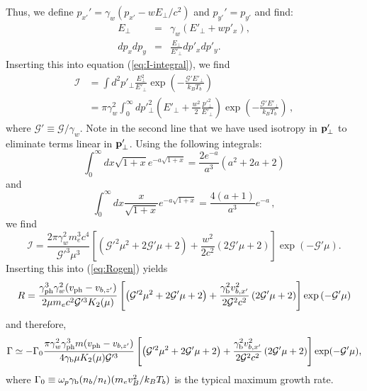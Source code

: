 \documentclass[usenatbib,iop,apj,numberedappendix]{aeb_emulateapj_2015}
\newcommand\qc[1]{{\color{red} \bf #1}}
\newcommand\bmath[1] {\mbox{\boldmath$\rm #1$}}
\def\bp{\bmath{p}}
\def\gph{\gamma_{\rm ph}}
\def\vph{v_{\rm ph}}
\def\cG{\mathcal{G}}
\newcommand{\kI}{\ensuremath{\mathcal{I}}}
\newcommand{\gammabeam}{\ensuremath{\gamma_{\rm b}}}
\begin{document}
\begin{appendix}
Thus, we define $p_{x'}'=\gamma_w(p_{x'}-w E_\perp/c^2)$ and $p_{y'}'=p_{y'}$ and find:
\begin{eqnarray}
E_\perp &=& \gamma_w(E'_\perp + w p'_x),\\
d p_x d p_y &=& \frac{E_\perp}{E'_\perp} d p'_x d p'_y.
\end{eqnarray}
Inserting this into equation (\ref{eq:I-integral}), we find
\begin{equation}
\begin{aligned}
\kI &= 
\int d^2\!p'_\perp \frac{E_\perp^2}{E'_\perp} \exp\left(-\frac{\cG'E'_\perp}{k_B T_b}\right)\\
&=
\pi \gamma_w^2 \int_0^\infty dp'^2_\perp \left(
  E'_\perp + \frac{w^2}{2} \frac{p'^2_\perp}{E'_\perp}
\right) \exp\left(-\frac{\cG'E'_\perp}{k_B T_b}\right)\,,
\end{aligned}
\end{equation}
where $\cG'\equiv\cG/\gamma_w$. Note in the second line that we have used isotropy in $\bp_{\perp}'$ to eliminate terms linear in $\bp_{\perp}'$. 
Using the following integrals: 
\begin{equation}
\int_0^\infty dx \sqrt{1+x} e^{-a\sqrt{1+x}} = \frac{2 e^{-a}}{a^3}\left(a^2 + 2a + 2\right)
\end{equation}
and 
\begin{equation}
\int_0^\infty dx \frac{x}{\sqrt{1+x}} e^{-a\sqrt{1+x}}
=
\frac{4(a+1)}{a^3} e^{-a}\,,
\end{equation}
we find
\begin{equation}
\kI =
\frac{2 \pi \gamma_w^2 m_e^3c^4}{\cG'^3\mu^3} \left[
\left(\cG'^2\mu^2+2\cG'\mu+2\right)
+
\frac{w^2}{2c^2}
\left(2\cG'\mu+2\right)
\right]\exp\left(-\cG'\mu\right).
\end{equation}
Inserting this into (\ref{eq:Rogen}) yields
\begin{equation}
R = \frac{
  \gph^3 \gamma_w^2 (\vph-v_{b,z'}) 
}{ 2 \mu m_ec^2 \cG'^3 K_2(\mu)}
\left[
\left(\cG'^2\mu^2 + 2\cG'\mu + 2\right)
+
\frac{\gammabeam^2 v_{b,x'}^2}{2\cG^2 c^2} \left(2 \cG'\mu + 2\right)
\right] \exp\left(-\cG'\mu\right)
\end{equation}
and therefore,
\begin{equation}
\Gamma \simeq - \Gamma_0
\frac{\pi \gamma_w^2 \gph^3 m (\vph-v_{b,z'})}{4 \gammabeam \mu K_2(\mu) \cG'^3}
\left[
\left( \cG'^2\mu^2 + 2\cG'\mu + 2 \right) 
+
\frac{\gammabeam^2 v_{b,x'}^2}{2\cG^2c^2} \left(2 \cG'\mu+ 2\right)
\right]
\exp(-\cG'\mu),
\label{eq:OGgen}
\end{equation}
where $\Gamma_0 \equiv \omega_p \gammabeam (n_b/n_t) (m_e v_B^2/k_B T_b)$ is the typical maximum growth rate.


\end{appendix}
\end{document}
